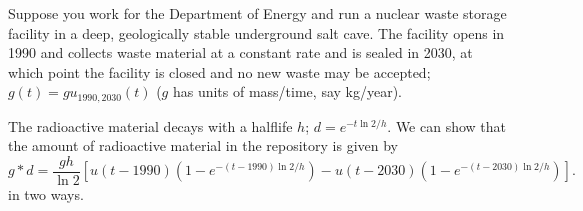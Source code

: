 \documentclass[answers]{exam}\newcommand{\repositoryInformationSetup}{     \usepackage[dvipsnames]{xcolor}     \usepackage[ angle=90, color=black, opacity=1, scale=2, ]{background}      \SetBgPosition{current page.west}      \SetBgVshift{-4.5mm}      \backgroundsetup{contents={{\color{green}\texttt{-{}-} differs from commit \texttt{40a9b87} in 0 files}}} } \newcommand{\commit}{{{\color{green}40a9b87}}}\usepackage{amsmath}
\providecommand{\id}{}
\renewcommand{\id}[1]{\ensuremath{\; \mathrm{d}#1}}
\begin{document}
\begin{questions}

	\question Suppose you work for the Department of Energy and run a nuclear waste storage facility in a deep, geologically stable underground salt cave.
	The facility opens in 1990 and collects waste material at a constant rate and is sealed in 2030, at which point the facility is closed and no new waste may be accepted; $g(t) = g u_{1990,2030}(t)$ ($g$ has units of mass/time, say kg/year).

	The radioactive material decays with a halflife $h$; $d=e^{-t \ln 2/h}$.
	We can show that the amount of radioactive material in the repository is given by
	\begin{equation}
		g*d = \frac{gh}{\ln 2} \left[u(t-1990)\left(1-e^{-(t-1990) \ln 2/h} \right)- u(t-2030)\left(1-e^{-(t-2030) \ln 2 / h}\right)\right].
	\end{equation}
	in two ways.


\end{questions}
\end{document}
